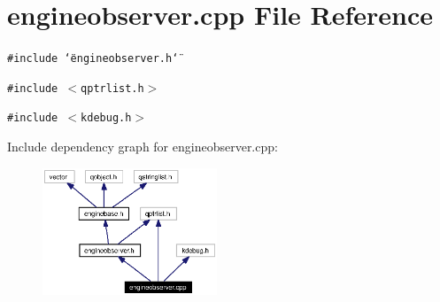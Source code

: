 \section{engineobserver.cpp File Reference}
\label{engineobserver_8cpp}


{\tt \#include \char`\"{}engineobserver.h\char`\"{}}\par
{\tt \#include $<$qptrlist.h$>$}\par
{\tt \#include $<$kdebug.h$>$}\par


Include dependency graph for engineobserver.cpp:\begin{figure}[H]
\begin{center}
\leavevmode
\includegraphics[width=148pt]{engineobserver_8cpp__incl}
\end{center}
\end{figure}
